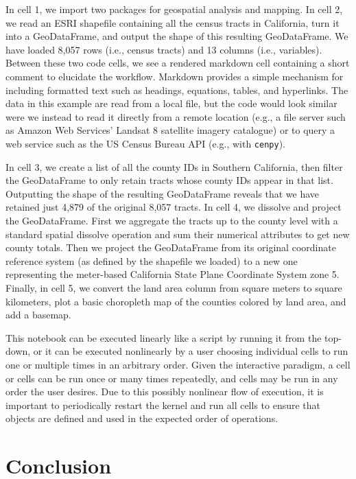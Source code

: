 \documentclass[11pt,letterpaper]{article}
\begin{document}
In cell 1, we import two packages for geospatial analysis and mapping. In cell 2, we read an ESRI shapefile containing all the census tracts in California, turn it into a GeoDataFrame, and output the shape of this resulting GeoDataFrame. We have loaded 8,057 rows (i.e., census tracts) and 13 columns (i.e., variables). Between these two code cells, we see a rendered markdown cell containing a short comment to elucidate the workflow. Markdown provides a simple mechanism for including formatted text such as headings, equations, tables, and hyperlinks. The data in this example are read from a local file, but the code would look similar were we instead to read it directly from a remote location (e.g., a file server such as Amazon Web Services' Landsat 8 satellite imagery catalogue) or to query a web service such as the US Census Bureau API (e.g., with \texttt{cenpy}).

In cell 3, we create a list of all the county IDs in Southern California, then filter the GeoDataFrame to only retain tracts whose county IDs appear in that list. Outputting the shape of the resulting GeoDataFrame reveals that we have retained just 4,879 of the original 8,057 tracts. In cell 4, we dissolve and project the GeoDataFrame. First we aggregate the tracts up to the county level with a standard spatial dissolve operation and sum their numerical attributes to get new county totals. Then we project the GeoDataFrame from its original coordinate reference system (as defined by the shapefile we loaded) to a new one representing the meter-based California State Plane Coordinate System zone 5. Finally, in cell 5, we convert the land area column from square meters to square kilometers, plot a basic choropleth map of the counties colored by land area, and add a basemap.

This notebook can be executed linearly like a script by running it from the top-down, or it can be executed nonlinearly by a user choosing individual cells to run one or multiple times in an arbitrary order. Given the interactive paradigm, a cell or cells can be run once or many times repeatedly, and cells may be run in any order the user desires. Due to this possibly nonlinear flow of execution, it is important to periodically restart the kernel and run all cells to ensure that objects are defined and used in the expected order of operations.

\section{Conclusion}
\end{document}

